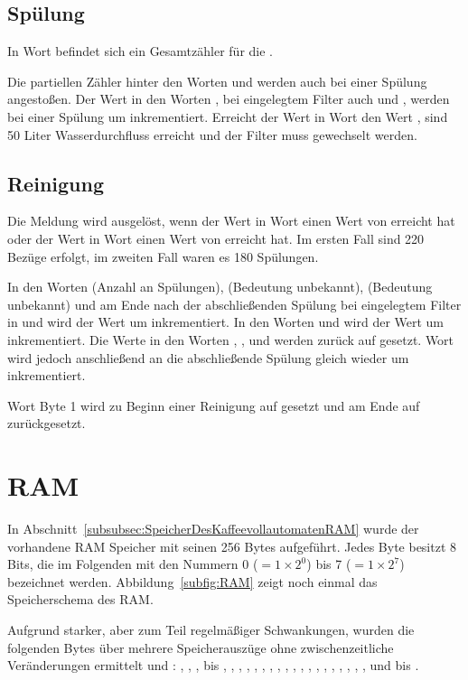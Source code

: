 \subsection{Spülung}
In Wort  befindet sich ein Gesamtzähler für die .

Die partiellen Zähler hinter den Worten  und  werden auch bei einer Spülung angestoßen.
Der Wert in den Worten , bei eingelegtem Filter auch  und , werden bei einer Spülung um  inkrementiert.
Erreicht der Wert in Wort  den Wert , sind 50 Liter Wasserdurchfluss erreicht und der Filter muss gewechselt werden.

\subsection{Reinigung}
Die Meldung wird ausgelöst, wenn der Wert in Wort  einen Wert von  erreicht hat oder der Wert in Wort  einen Wert von  erreicht hat.
Im ersten Fall sind 220 Bezüge erfolgt, im zweiten Fall waren es 180 Spülungen.

In den Worten  (Anzahl an Spülungen),  (Bedeutung unbekannt),  (Bedeutung unbekannt) und am Ende nach der abschließenden Spülung bei eingelegtem Filter in  und  wird der Wert um  inkrementiert.
In den Worten  und  wird der Wert um  inkrementiert.
Die Werte in den Worten , ,  und  werden zurück auf  gesetzt.
Wort  wird jedoch anschließend an die abschließende Spülung gleich wieder um  inkrementiert.

Wort  Byte 1 wird zu Beginn einer Reinigung auf  gesetzt und am Ende auf  zurückgesetzt.

\section{RAM}\label{sec:ErgebnisseRAM}
In Abschnitt~\ref{subsubsec:SpeicherDesKaffeevollautomatenRAM} wurde der vorhandene \acf{RAM} Speicher mit seinen 256 Bytes aufgeführt.
Jedes Byte besitzt 8 Bits, die im Folgenden mit den Nummern 0 ($=1\times 2^0$) bis 7 ($=1\times 2^7$) bezeichnet werden.
Abbildung~\ref{subfig:RAM} zeigt noch einmal das Speicherschema des \ac{RAM}.

Aufgrund starker, aber zum Teil regelmäßiger Schwankungen, wurden die folgenden Bytes über mehrere Speicherauszüge ohne zwischenzeitliche Veränderungen ermittelt und :
, , ,  bis , , , , , , , , , , , , , , , , , , ,  und  bis .

